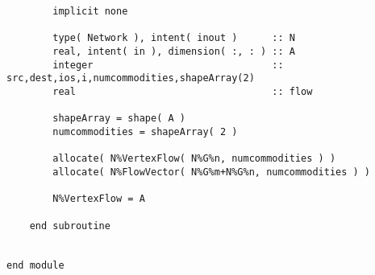 \documentclass[10pt,a4paper,margin = 1.25cm]{article}
\begin{document}
\begin{lstlisting}
        implicit none

        type( Network ), intent( inout )      :: N
        real, intent( in ), dimension( :, : ) :: A
        integer                               :: src,dest,ios,i,numcommodities,shapeArray(2)
        real                                  :: flow
        
        shapeArray = shape( A )
        numcommodities = shapeArray( 2 )
        
        allocate( N%VertexFlow( N%G%n, numcommodities ) )
        allocate( N%FlowVector( N%G%m+N%G%n, numcommodities ) )
        
        N%VertexFlow = A
              
    end subroutine
    
    
end module
\end{lstlisting}
\end{document}
